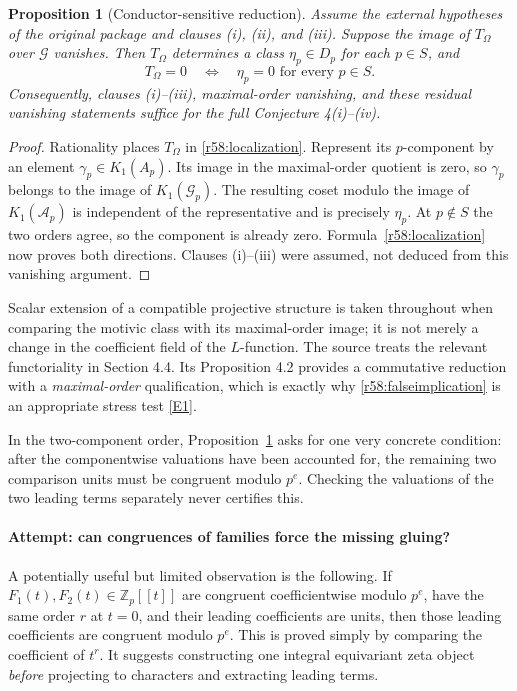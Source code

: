 \documentclass[11pt,a4paper]{article}
\newcommand{\Z}{\mathbb{Z}}
\newcommand{\eref}[2]{\hyperlink{extra:#1:#2}{[E#2]}}
\newtheorem{notebookproposition}[notebooklemma]{Proposition}
\numberwithin{equation}{section}
\begin{document}
\begin{notebookproposition}[Conductor-sensitive reduction]\label{r58:reduction}
Assume the external hypotheses of the original package and clauses (i), (ii), and (iii). Suppose the image of $T_\Omega$ over $\mathcal G$ vanishes. Then $T_\Omega$ determines a class $\eta_p\in D_p$ for each $p\in S$, and
\[
 T_\Omega=0\quad\Longleftrightarrow\quad
                \eta_p=0\text{ for every }p\in S.
\]
Consequently, clauses (i)--(iii), maximal-order vanishing, and these residual vanishing statements suffice for the \emph{full} Conjecture 4(i)--(iv).
\end{notebookproposition}
\begin{proof}
Rationality places $T_\Omega$ in \eqref{r58:localization}. Represent its $p$-component by an element $\gamma_p\in K_1(A_p)$. Its image in the maximal-order quotient is zero, so $\gamma_p$ belongs to the image of $K_1(\mathcal G_p)$. The resulting coset modulo the image of $K_1(\mathcal A_p)$ is independent of the representative and is precisely $\eta_p$. At $p\notin S$ the two orders agree, so the component is already zero. Formula~\eqref{r58:localization} now proves both directions. Clauses (i)--(iii) were assumed, not deduced from this vanishing argument.
\end{proof}

Scalar extension of a compatible projective structure is taken throughout when comparing the motivic class with its maximal-order image; it is not merely a change in the coefficient field of the $L$-function. The source treats the relevant functoriality in Section 4.4. Its Proposition 4.2 provides a commutative reduction with a \emph{maximal-order} qualification, which is exactly why \eqref{r58:falseimplication} is an appropriate stress test \eref{statement}{1}.

In the two-component order, Proposition~\ref{r58:reduction} asks for one very concrete condition: after the componentwise valuations have been accounted for, the remaining two comparison units must be congruent modulo $p^e$. Checking the valuations of the two leading terms separately never certifies this.

\paragraph{Attempt: can congruences of families force the missing gluing?}
A potentially useful but limited observation is the following. If
$F_1(t),F_2(t)\in\Z_p[[t]]$ are congruent coefficientwise modulo $p^e$, have the same order $r$ at $t=0$, and their leading coefficients are units, then those leading coefficients are congruent modulo $p^e$. This is proved simply by comparing the coefficient of $t^r$. It suggests constructing one integral equivariant zeta object \emph{before} projecting to characters and extracting leading terms.
\end{document}
